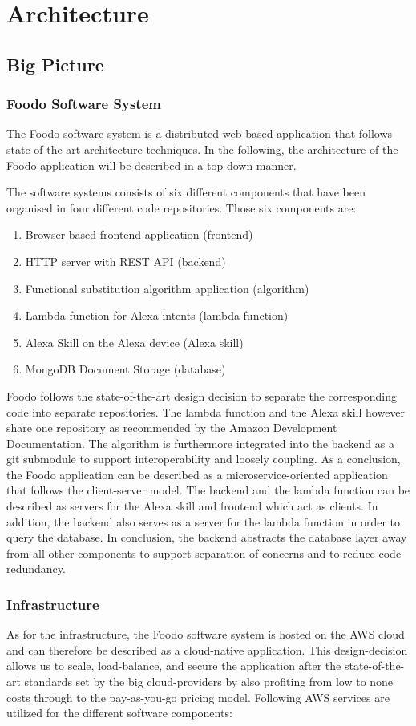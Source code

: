 \chapter{Architecture}
\section{Big Picture}
\subsection{Foodo Software System}
The Foodo software system is a distributed web based application that follows state-of-the-art architecture techniques. In the following, the architecture of the Foodo application will be described in a top-down manner.
 

The software systems consists of six different components that have been organised in four different code repositories. Those six components are:
\begin{enumerate}
	\item Browser based frontend application (frontend)
	\item HTTP server with REST API (backend)
	\item Functional substitution algorithm application (algorithm)
	\item Lambda function for Alexa intents (lambda function)
	\item Alexa Skill on the Alexa device (Alexa skill)
	\item MongoDB Document Storage (database)
\end{enumerate}

Foodo follows the state-of-the-art design decision to separate the corresponding code into separate repositories. The lambda function and the Alexa skill however share one repository as recommended by the Amazon Development Documentation. The algorithm is furthermore integrated into the backend as a git submodule to support interoperability and loosely coupling. As a conclusion, the Foodo application can be described as a microservice-oriented application that follows the client-server model. The backend and the lambda function can be described as servers for the Alexa skill and frontend which act as clients. In addition, the backend also serves as a server for the lambda function in order to query the database. In conclusion, the backend abstracts the database layer away from all other components to support separation of concerns and to reduce code redundancy. 

\subsection{Infrastructure}
As for the infrastructure, the Foodo software system is hosted on the AWS cloud and can therefore be described as a cloud-native application. This design-decision allows us to scale, load-balance, and secure the application after the state-of-the-art standards set by the big cloud-providers by also profiting from low to none costs through to the pay-as-you-go pricing model. Following AWS services are utilized for the different software components:

